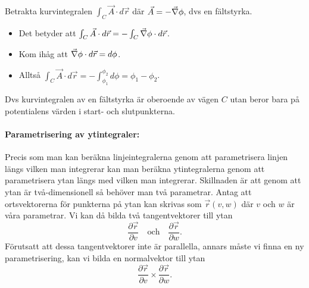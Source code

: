 \documentclass[%
oneside,                 %
final,                   %
10pt]{article}
\newenvironment{notice_mdfboxadmon}[1][]{
\begin{notice_mdfboxmdframed}[frametitle=#1]
}
{
\end{notice_mdfboxmdframed}
}
\begin{document}
\begin{notice_mdfboxadmon}

Betrakta kurvintegralen $\int_C \vec{A} \cdot d\vec{r}$ där $\vec{A} = -\vec{\nabla} \phi$, dvs en fältstyrka.
\begin{itemize}
\item Det betyder att $\int_C \vec{A} \cdot d\vec{r} = -\int_C \vec{\nabla}{\phi} \cdot d\vec{r}$.

\item Kom ihåg att $\vec{\nabla}\phi \cdot d\vec{r} = d\phi$.

\item Alltså $\int_C \vec{A} \cdot d\vec{r} = -\int_{\phi_1}^{\phi_2} d{\phi} = \phi_1 - \phi_2$.
\end{itemize}

\noindent
Dvs kurvintegralen av en fältstyrka är oberoende av vägen $C$ utan beror bara på potentialens värden i start- och slutpunkterna.
\end{notice_mdfboxadmon} %





\paragraph{Parametrisering av ytintegraler:}
Precis som man kan beräkna linjeintegralerna genom att parametrisera linjen längs vilken man integrerar kan man beräkna ytintegralerna genom att parametrisera ytan längs med vilken man integrerar.  Skillnaden är att genom att ytan är två-dimensionell så behöver man två parametrar. Antag att ortsvektorerna för punkterna på ytan kan skrivas som $\vec{r}(v,w)$ där $v$ och $w$ är våra parametrar.  Vi kan då bilda två tangentvektorer till ytan
\begin{equation}
  \frac{\partial \vec{r}}{\partial v} \quad \mathrm{och} \quad
\frac{\partial \vec{r}}{\partial w}.
\end{equation}
Förutsatt att dessa tangentvektorer inte är parallella, annars måste vi finna en ny parametrisering, kan vi bilda en normalvektor till ytan
\begin{equation}
  \frac{\partial \vec{r}}{\partial v} \times \frac{\partial \vec{r}}{\partial w}.
\end{equation}



\vspace{6mm}
\end{document}
